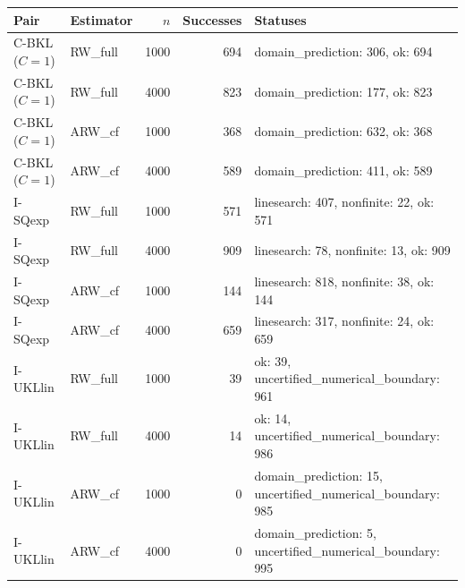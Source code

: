 \begin{tabular}{llrrl}
\hline
Pair & Estimator & $n$ & Successes & Statuses \\
\hline
C-BKL ($C=1$) & RW\_full & 1000 & 694 & domain\_prediction: 306, ok: 694 \\
C-BKL ($C=1$) & RW\_full & 4000 & 823 & domain\_prediction: 177, ok: 823 \\
C-BKL ($C=1$) & ARW\_cf & 1000 & 368 & domain\_prediction: 632, ok: 368 \\
C-BKL ($C=1$) & ARW\_cf & 4000 & 589 & domain\_prediction: 411, ok: 589 \\
I-SQexp & RW\_full & 1000 & 571 & linesearch: 407, nonfinite: 22, ok: 571 \\
I-SQexp & RW\_full & 4000 & 909 & linesearch: 78, nonfinite: 13, ok: 909 \\
I-SQexp & ARW\_cf & 1000 & 144 & linesearch: 818, nonfinite: 38, ok: 144 \\
I-SQexp & ARW\_cf & 4000 & 659 & linesearch: 317, nonfinite: 24, ok: 659 \\
I-UKLlin & RW\_full & 1000 & 39 & ok: 39, uncertified\_numerical\_boundary: 961 \\
I-UKLlin & RW\_full & 4000 & 14 & ok: 14, uncertified\_numerical\_boundary: 986 \\
I-UKLlin & ARW\_cf & 1000 & 0 & domain\_prediction: 15, uncertified\_numerical\_boundary: 985 \\
I-UKLlin & ARW\_cf & 4000 & 0 & domain\_prediction: 5, uncertified\_numerical\_boundary: 995 \\
\hline
\end{tabular}
